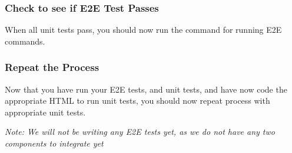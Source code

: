 \subsubsection{ Check to see if E2E Test Passes }
When all unit tests pass, you should now run the command for running E2E
commands.

\subsubsection{ Repeat the Process }
Now that you have run your E2E tests, and unit tests, and have now code
the appropriate HTML to run unit tests, you should now repeat process with
appropriate unit tests.

\textit{Note: We will not be writing any E2E tests yet, as we do not have any
two components to integrate yet}
